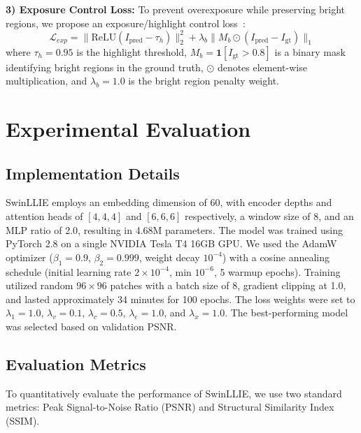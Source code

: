 \documentclass[conference]{IEEEtran}
\begin{document}
\textbf{3) Exposure Control Loss:} To prevent overexposure while preserving bright regions, we propose an exposure/highlight control loss~\cite{rlunet2024overexposure,afifi2021exposurecorrection,lee2022hsvnet,eilertsen2017singlehdr}:
\begin{equation}
\mathcal{L}_{exp} = \|\text{ReLU}(I_{\text{pred}} - \tau_h)\|_2^2 + \lambda_b \|M_b \odot (I_{\text{pred}} - I_{\text{gt}})\|_1
\end{equation}
where $\tau_h = 0.95$ is the highlight threshold, $M_b = \mathbf{1}[I_{\text{gt}} > 0.8]$ is a binary mask identifying bright regions in the ground truth, $\odot$ denotes element-wise multiplication, and $\lambda_b = 1.0$ is the bright region penalty weight.

\section{Experimental Evaluation}

\subsection{Implementation Details}

SwinLLIE employs an embedding dimension of 60, with encoder depths and attention heads of $[4, 4, 4]$ and $[6, 6, 6]$ respectively, a window size of 8, and an MLP ratio of 2.0, resulting in 4.68M parameters. The model was trained using PyTorch 2.8 on a single NVIDIA Tesla T4 16GB GPU. We used the AdamW optimizer ($\beta_1 = 0.9$, $\beta_2 = 0.999$, weight decay $10^{-4}$) with a cosine annealing schedule (initial learning rate $2 \times 10^{-4}$, min $10^{-6}$, 5 warmup epochs). Training utilized random $96 \times 96$ patches with a batch size of 8, gradient clipping at 1.0, and lasted approximately 34 minutes for 100 epochs. The loss weights were set to $\lambda_1 = 1.0$, $\lambda_v = 0.1$, $\lambda_c = 0.5$, $\lambda_e = 1.0$, and $\lambda_x = 1.0$. The best-performing model was selected based on validation PSNR.

\subsection{Evaluation Metrics}

To quantitatively evaluate the performance of SwinLLIE, we use two standard metrics: Peak Signal-to-Noise Ratio (PSNR) and Structural Similarity Index (SSIM).
\end{document}
